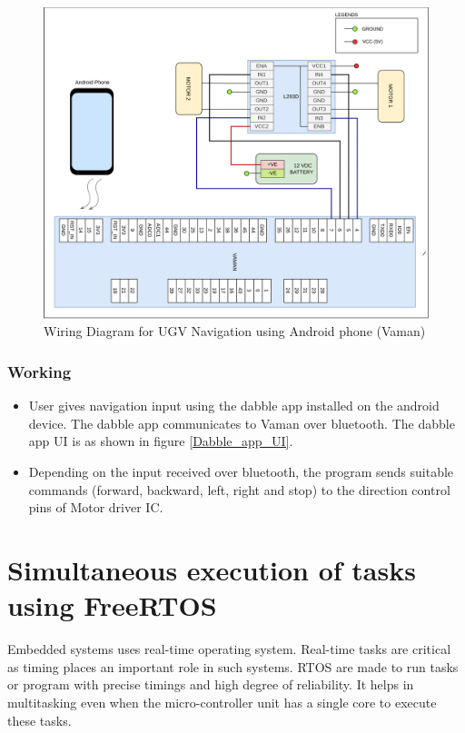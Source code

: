 \begin{figure}[h!]
\centering
\includegraphics[width=\columnwidth]{./Figures/Wiring_UGV_phone_vaman.png}
\caption{Wiring Diagram for UGV Navigation using Android phone (Vaman)}
\label{Wiring_UGV_phone_vaman}
\end{figure}

\subsubsection{Working}
\begin{itemize}
    \item User gives navigation input using the dabble app installed on the android device. The dabble app communicates to Vaman over bluetooth. The dabble app UI is as shown in figure \ref{Dabble_app_UI}.
    \item Depending on the input received over bluetooth, the program sends suitable commands (forward, backward, left, right and stop) to the direction control pins of Motor driver IC.
\end{itemize}

\newpage
\section{Simultaneous execution of tasks using FreeRTOS}

Embedded systems uses real-time operating system. Real-time tasks are critical as timing places an important role in such systems. RTOS are made to run tasks or program with precise timings and high degree of reliability. It helps in multitasking even when the micro-controller unit has a single core to execute these tasks.

